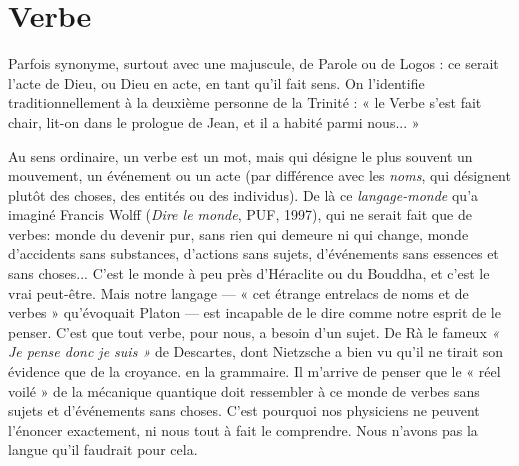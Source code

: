 \section{Verbe}
Parfois synonyme, surtout avec une majuscule, de Parole ou de Logos :
ce serait l’acte de Dieu, ou Dieu en acte, en tant qu’il fait sens. On
l’identifie traditionnellement à la deuxième personne de la Trinité : « le Verbe
s’est fait chair, lit-on dans le prologue de Jean, et il a habité parmi nous... »

Au sens ordinaire, un verbe est un mot, mais qui désigne le plus souvent un
mouvement, un événement ou un acte (par différence avec les {\it noms}, qui
désignent plutôt des choses, des entités ou des individus). De là ce {\it langage-monde} 
qu'a imaginé Francis Wolff ({\it Dire le monde}, PUF, 1997), qui ne serait
fait que de verbes: monde du devenir pur, sans rien qui demeure ni qui
change, monde d’accidents sans substances, d’actions sans sujets, d'événements
sans essences et sans choses... C’est le monde à peu près d'Héraclite ou du
Bouddha, et c’est le vrai peut-être. Mais notre langage — « cet étrange entrelacs
de noms et de verbes » qu’évoquait Platon — est incapable de le dire comme
notre esprit de le penser. C’est que tout verbe, pour nous, a besoin d’un sujet.
De Rà le fameux {\it « Je pense donc je suis »} de Descartes, dont Nietzsche a bien vu
qu'il ne tirait son évidence que de la croyance. en la grammaire. Il m'arrive
de penser que le « réel voilé » de la mécanique quantique doit ressembler à ce
monde de verbes sans sujets et d’événements sans choses. C’est pourquoi nos
physiciens ne peuvent l’énoncer exactement, ni nous tout à fait le comprendre.
Nous n'avons pas la langue qu’il faudrait pour cela.

